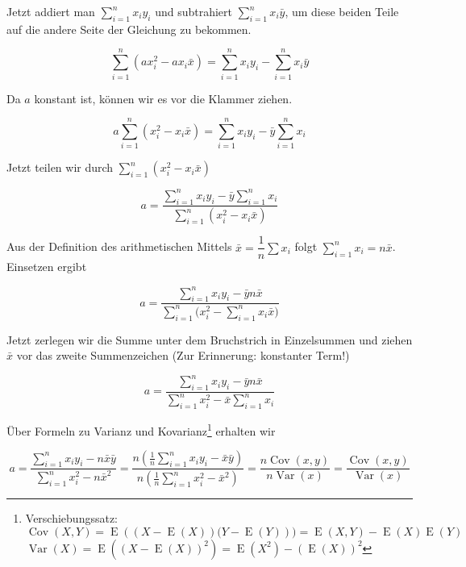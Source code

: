 \documentclass[ngerman, 12pt]{scrartcl}
\def\sm{\sum\limits_{i=1}^{n}}
\DeclareMathOperator{\cov}{Cov}
\DeclareMathOperator{\var}{Var}
\DeclareMathOperator{\E}{E}
\begin{document}
Jetzt addiert man \(\sm x_iy_i\) und subtrahiert \(\sm x_i\bar{y}\), um diese beiden Teile auf die andere Seite der Gleichung zu bekommen.

\begin{equation}
\sm (ax_i^2 -ax_i\bar{x}) = \sm x_iy_i - \sm x_i\bar{y} 
\end{equation}

Da \(a\) konstant ist, können wir es vor die Klammer ziehen.

\begin{equation}
a \sm (x_i^2 -x_i\bar{x}) = \sm x_iy_i - \bar{y} \sm x_i 
\end{equation}

Jetzt teilen wir durch \(\sm (x_i^2 -x_i\bar{x})\)



\begin{equation}
a =  \dfrac{\sm x_iy_i - \bar{y} \sm x_i}{\sm (x_i^2 -x_i\bar{x})} 
\end{equation}

Aus der Definition des arithmetischen Mittels $\bar{x} = \dfrac{1}{n}\sum x_i$ folgt $\sm x_i= n\bar{x}$. Einsetzen ergibt 

\begin{equation}
a =  \dfrac{\sm x_iy_i - \bar{y} n \bar{x}}{ \sm \big( x_i^2 -  \sm x_i \bar{x} \big)}
\end{equation}


Jetzt zerlegen wir die Summe unter dem Bruchstrich in Einzelsummen und ziehen \(\bar{x}\) vor das zweite Summenzeichen (Zur Erinnerung: konstanter Term!)

\begin{equation}
a =  \dfrac{\sm x_iy_i - \bar{y} n\bar{x}}{\sm x_i^2 - \bar{x} \sm x_i}
\end{equation}

Über Formeln zu Varianz und Kovarianz\footnote{Verschiebungssatz: \\ $\cov(X,Y) = \E \left((X - \E(X))(Y - \E(Y)\right)) =\E(X,Y)- \E(X)\E(Y)$ \\ $\var(X)=\E\left(\left(X-\E(X)\right)^2\right)=\E(X^2)-\left(\E(X)\right)^2$} erhalten wir

\begin{equation}
a =  \dfrac{\sm x_iy_i - n\bar{x}\bar{y}}{\sm x_i^2 -n\bar{x}^2} = \dfrac{n \left(\frac{1}{n}\sm x_iy_i - \bar{x}\bar{y}\right)}{ n\left( \frac{1}{n}\sm x_i^2 -\bar{x}^2\right)}  = \dfrac{n\cov(x,y)}{n\var(x)} = \dfrac{\cov(x,y)}{\var(x)}
\end{equation}
\end{document}
